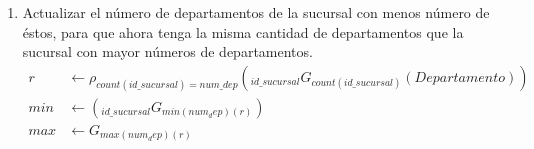\documentclass{article}
\begin{document}
\begin{enumerate}
{            insertada anteriormente.
        }
        \item {
            Actualizar el número de departamentos de la sucursal con menos
            número de éstos, para que ahora tenga la misma cantidad de departamentos
            que la sucursal con mayor números de departamentos.
            \begin{align*}
                r &\leftarrow \rho_{count(id\_sucursal) = num\_dep}
                (_{id\_sucursal}G_{count(id\_sucursal)}(Departamento))\\
                min &\leftarrow (_{id\_sucursal}G_{min(num_dep)(r)})\\
                max &\leftarrow G_{max(num_dep)(r)}\\
            \end{align*}
        }
    \end{enumerate}
\end{document}

